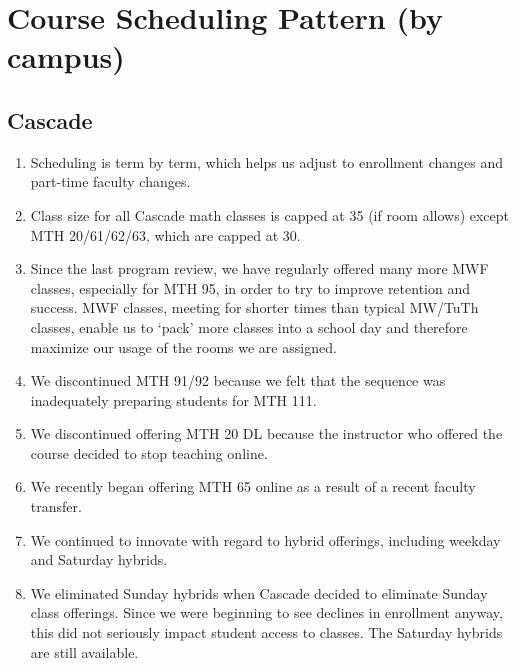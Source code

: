 
\chapter{Course Scheduling Pattern (by campus)}\label{sec:app:courseschedule}
\section*{Cascade}
\begin{enumerate}
    \item  Scheduling is term by term, which helps us adjust to enrollment
      changes and part-time faculty changes.
    \item  Class size for all Cascade math classes is capped at 35 (if room
      allows) except MTH 20/61/62/63, which are capped at 30.
    \item  Since the last program review, we have regularly offered many more
      MWF classes, especially for MTH 95, in order to try to improve retention
      and success.  MWF classes, meeting for shorter times than typical MW/TuTh
      classes, enable us to `pack' more classes into a school day and therefore
      maximize our usage of the rooms we are assigned.
    \item  We discontinued MTH 91/92 because we felt that the sequence was
      inadequately preparing students for MTH 111.
    \item We discontinued offering MTH 20 DL because the instructor who offered the course         decided to stop teaching online. 
    \item We recently began offering MTH 65 online as a result of a recent faculty transfer. 
    \item  We continued to innovate with regard to hybrid offerings, including
      weekday and Saturday hybrids.
    \item  We eliminated Sunday hybrids when Cascade decided to eliminate
      Sunday class offerings.  Since we were beginning to see declines in
      enrollment anyway, this did not seriously impact student access to
      classes.  The Saturday hybrids are still available.
\end{enumerate}

